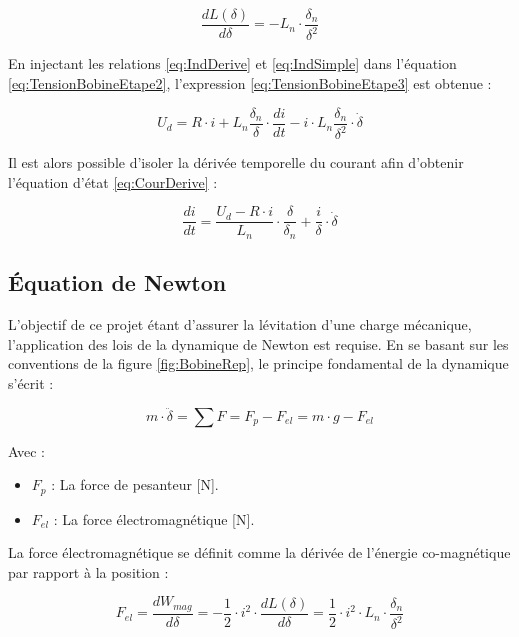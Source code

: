 \begin{equation}
    \frac{dL(\delta)}{d\delta} = -L_n \cdot \frac{\delta_n}{\delta^2}
    \label{eq:IndDerive}
\end{equation}

En injectant les relations \ref{eq:IndDerive} et \ref{eq:IndSimple} dans l'équation \ref{eq:TensionBobineEtape2}, l'expression \ref{eq:TensionBobineEtape3} est obtenue :

\begin{equation}
    U_d = R \cdot i + L_n \frac{\delta_n}{\delta} \cdot \frac{di}{dt} - i \cdot L_n \frac{\delta_n}{\delta^2} \cdot \dot{\delta}
    \label{eq:TensionBobineEtape3}
\end{equation}

Il est alors possible d'isoler la dérivée temporelle du courant afin d'obtenir l'équation d'état \ref{eq:CourDerive} :

\begin{equation}
    \frac{di}{dt} = \frac{U_d - R \cdot i}{L_n} \cdot \frac{\delta}{\delta_n} + \frac{i}{\delta} \cdot \dot{\delta}
    \label{eq:CourDerive}
\end{equation}

\subsection{Équation de Newton}
L'objectif de ce projet étant d'assurer la lévitation d'une charge mécanique, l'application des lois de la dynamique de Newton est requise. En se basant sur les conventions de la figure \ref{fig:BobineRep}, le principe fondamental de la dynamique s'écrit :

\begin{equation}
    m \cdot \ddot{\delta} =\sum F = F_p - F_{el} = m \cdot g - F_{el}
    \label{eq:Newton1}
\end{equation}

Avec :
\begin{itemize}
    \item $F_p$ : La force de pesanteur [N].
    \item $F_{el}$ : La force électromagnétique [N].
\end{itemize}

La force électromagnétique se définit comme la dérivée de l'énergie co-magnétique par rapport à la position :
\label{subsec:Fele}

\begin{equation}
    F_{el} =\frac{dW_{mag}}{d\delta}= - \frac{1}{2} \cdot i^2 \cdot \frac{dL(\delta)}{d\delta} = \frac{1}{2} \cdot i^2 \cdot L_n \cdot \frac{\delta_n}{\delta^2}
    \label{eq:Fele}
\end{equation}

